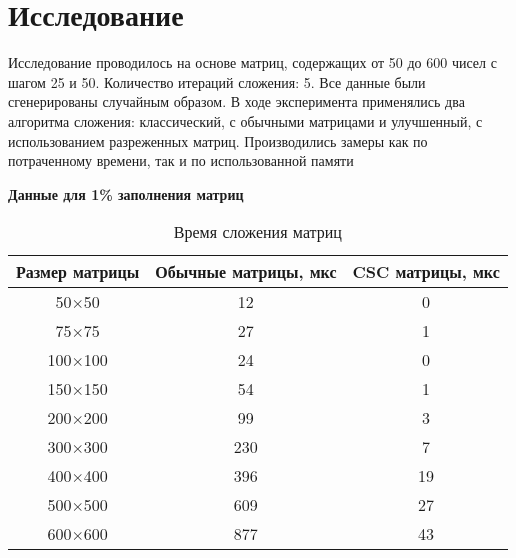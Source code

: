 \section{Исследование}
\setcounter{table}{0}
Исследование проводилось на основе матриц, содержащих от 50 до 600 чисел с шагом 25 и 50. Количество итераций сложения: 5. Все данные
были сгенерированы случайным образом. В ходе эксперимента применялись
два алгоритма сложения: классический, с обычными матрицами и улучшенный, с использованием разреженных матриц. 
Производились замеры как по потраченному времени, так и по использованной памяти

\vspace{1.5em}
\textbf{Данные для 1\% заполнения матриц}
\begin{table}[H]
	\centering
	\caption{Время сложения матриц}
	\begin{tabular}{|c|c|c|}
		\hline
		Размер матрицы & Обычные матрицы, мкс & CSC матрицы, мкс \\ \hline
		50$\times$50         & 12                   & 0                \\ \hline
		75$\times$75         & 27                   & 1                \\ \hline
		100$\times$100        & 24                   & 0                \\ \hline
		150$\times$150        & 54                   & 1                \\ \hline
		200$\times$200        & 99                   & 3                \\ \hline
		300$\times$300        & 230                  & 7                \\ \hline
		400$\times$400        & 396                  & 19               \\ \hline
		500$\times$500        & 609                  & 27               \\ \hline
		600$\times$600        & 877                  & 43               \\ \hline
	\end{tabular}
\end{table}

